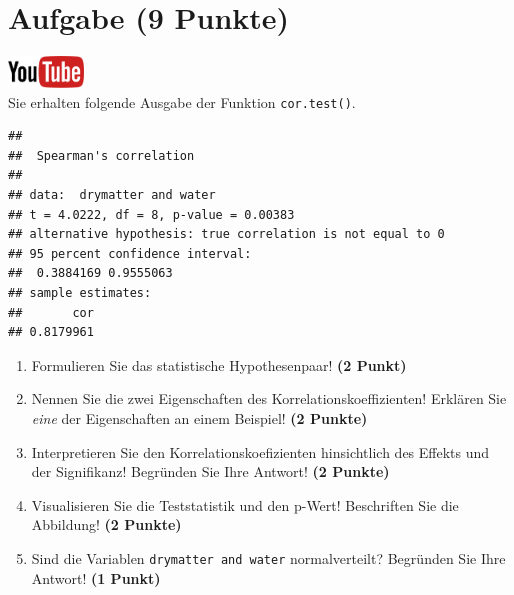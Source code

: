 \documentclass[a4paper, 9pt]{scrartcl}\usepackage[]{graphicx}\usepackage[]{xcolor}
\makeatletter
\newenvironment{kframe}{%
 \def\at@end@of@kframe{}%
 \ifinner\ifhmode%
  \def\at@end@of@kframe{\end{minipage}}%
  \begin{minipage}{\columnwidth}%
 \fi\fi%
 \def\FrameCommand##1{\hskip\@totalleftmargin \hskip-\fboxsep
 \colorbox{shadecolor}{##1}\hskip-\fboxsep
     \hskip-\linewidth \hskip-\@totalleftmargin \hskip\columnwidth}%
 \MakeFramed {\advance\hsize-\width
   \@totalleftmargin\z@ \linewidth\hsize
   \@setminipage}}%
 {\par\unskip\endMakeFramed%
 \at@end@of@kframe}
\newenvironment{knitrout}{}{} %
\makeatother
\begin{document}
 
\clearpage

\section{Aufgabe \hfill (9 Punkte)}

\hfill\href{https://youtu.be/C9skfFRTHhI}{\includegraphics[width =
   2cm]{img/youtube}}\\[1Ex]

Sie erhalten folgende \Rlogo Ausgabe der Funktion \texttt{cor.test()}.

\begin{knitrout}
\color{fgcolor}\begin{kframe}
\begin{verbatim}
## 
## 	Spearman's correlation
## 
## data:  drymatter and water
## t = 4.0222, df = 8, p-value = 0.00383
## alternative hypothesis: true correlation is not equal to 0
## 95 percent confidence interval:
##  0.3884169 0.9555063
## sample estimates:
##       cor 
## 0.8179961
\end{verbatim}
\end{kframe}
\end{knitrout}


\begin{enumerate}
  \item Formulieren Sie das statistische Hypothesenpaar! \textbf{(2
Punkt)}
\item Nennen Sie die zwei Eigenschaften des Korrelationskoeffizienten!
  Erkl{\"a}ren Sie \textit{eine} der Eigenschaften an einem Beispiel! \textbf{(2
    Punkte)}
\item Interpretieren Sie den Korrelationskoefizienten hinsichtlich des
  Effekts und der Signifikanz! Begr{\"u}nden Sie
  Ihre Antwort! \textbf{(2 Punkte)}
\item Visualisieren Sie die Teststatistik und den p-Wert! Beschriften Sie die Abbildung! \textbf{(2 Punkte)} 
\item Sind die Variablen \texttt{drymatter and water} normalverteilt?
  Begr{\"u}nden Sie Ihre Antwort! \textbf{(1 Punkt)}
\end{enumerate} 
\clearpage
\end{document}
